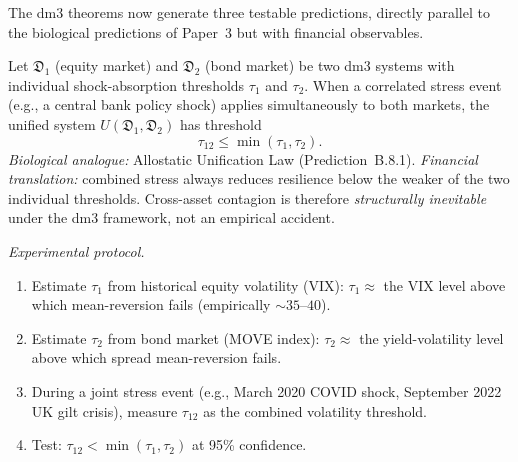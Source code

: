 The dm3 theorems now generate three testable predictions, directly
parallel to the biological predictions of Paper~3 but with
financial observables.

\begin{prediction}
\label{pred:market1}
Let $\mathfrak{D}_1$ (equity market) and $\mathfrak{D}_2$
(bond market) be two dm3 systems with individual shock-absorption
thresholds $\tau_1$ and $\tau_2$. When a correlated stress event
(e.g., a central bank policy shock) applies simultaneously to
both markets, the unified system $U(\mathfrak{D}_1, \mathfrak{D}_2)$
has threshold
\[
  \tau_{12} \le \min(\tau_1, \tau_2).
\]
\textit{Biological analogue:} Allostatic Unification Law
(Prediction~B.8.1). \textit{Financial translation:} combined
stress always reduces resilience below the weaker of the two
individual thresholds. Cross-asset contagion is therefore
\emph{structurally inevitable} under the dm3 framework, not an
empirical accident.

\textit{Experimental protocol.}
\begin{enumerate}[label=(\arabic*)]
  \item Estimate $\tau_1$ from historical equity volatility
    (VIX): $\tau_1 \approx$ the VIX level above which
    mean-reversion fails (empirically $\sim 35$--$40$).
  \item Estimate $\tau_2$ from bond market (MOVE index):
    $\tau_2 \approx$ the yield-volatility level above which
    spread mean-reversion fails.
  \item During a joint stress event (e.g., March 2020 COVID
    shock, September 2022 UK gilt crisis), measure $\tau_{12}$
    as the combined volatility threshold.
  \item Test: $\tau_{12} < \min(\tau_1, \tau_2)$ at 95\%
    confidence.
\end{enumerate}
\end{prediction}

